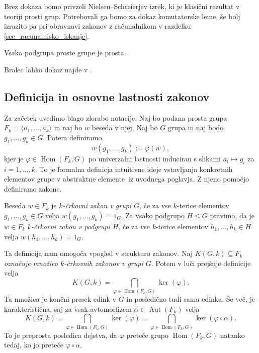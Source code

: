 Brez dokaza bomo privzeli Nielsen--Schreierjev izrek, ki je klasični rezultat v teoriji prosti grup. Potrebovali ga bomo za dokaz komutatorske leme,
še bolj izrazito pa pri obravnavi zakonov z računalnikom v razdelku \ref{sec_racunalnisko_iskanje}. 

\begin{izrek}
\label{izr_nielsen_schreier}
 Vsaka podgrupa proste grupe je prosta.
\end{izrek}

Bralec lahko dokaz najde v \cite[str.~5--8]{Lyndon_Schupp_2015}.

\subsection{Definicija in osnovne lastnosti zakonov}\label{sec_osnovne_lastnosti_zakonov}

Za začetek uvedimo blago zlorabo notacije. Naj bo podana prosta grupa $F_k = \langle a_1, \ldots, a_k \rangle$ in naj bo $w$ beseda v njej.
Naj bo $G$ grupa in naj bodo $g_1, \ldots, g_k \in G$. Potem definiramo \begin{equation*}
    w(g_1, \ldots, g_k) := \varphi(w),
\end{equation*}
kjer je $\varphi \in \operatorname{Hom}(F_k, G)$ po univerzalni lastnosti induciran s slikami $a_i \mapsto g_i$ za $i = 1, \ldots, k$.
To je formalna definicja intuitivne ideje \glqq vstavljanja konkretnih elementov grupe v abstraktne elemente\grqq~iz uvodnega poglavja. Z njeno pomočjo definiramo zakone.

\begin{definicija}\label{def_zakon_formalna}
    Beseda $w \in F_k$ je \emph{$k$-črkovni zakon v grupi $G$}, če za vse $k$-terice elementov $g_1, \ldots, g_k \in G$ velja $w(g_1, \ldots, g_k) = 1_G$.
    Za vsako podgrupo $H \le G$ pravimo, da je $w \in F_k$ \emph{$k$-črkovni zakon v podgrupi $H$}, če za vse $k$-terice elementov $h_1, \ldots, h_k \in H$ velja $w(h_1, \ldots, h_k) = 1_G$.
\end{definicija}

Ta definicija nam omogoča vpogled v strukturo zakonov. Naj \emph{$K(G, k) \subseteq F_k$ označuje množico $k$-črkovnih zakonov v grupi $G$}. Potem v luči prejšnje definicije velja
\begin{equation*}
K(G, k)  = \bigcap_{\varphi \in \operatorname{Hom}(F_k, G)} \ker(\varphi).   
\end{equation*}  
Ta množica je končni presek edink v $G$ in posledično tudi sama edinka. Še več, je karakteristična, saj za vsak avtomorfizem $\alpha \in \operatorname{Aut}(F_k)$ velja
\begin{equation*}
    K(G, k)  = \bigcap_{\varphi \in \operatorname{Hom}(F_k, G)} \ker(\varphi) = \bigcap_{\varphi \in \operatorname{Hom}(F_k, G)} \ker(\varphi \circ \alpha). 
\end{equation*}  
To je preprosta posledica dejstva, da $\varphi$ preteče grupo $\operatorname{Hom}(F_k, G)$ natanko tedaj, ko jo preteče $\varphi \circ \alpha$.     


